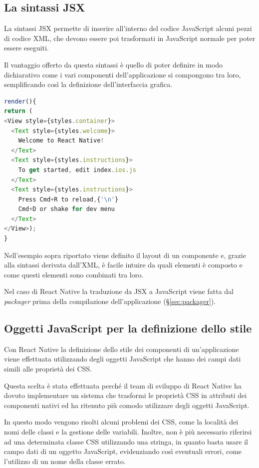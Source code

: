 \subsection{La sintassi JSX}

La sintassi JSX permette di inserire all'interno del codice JavaScript alcuni pezzi di codice XML, che devono essere poi trasformati in JavaScript normale per poter essere eseguiti.

Il vantaggio offerto da questa sintassi è quello di poter definire in modo dichiarativo come i vari componenti dell'applicazione si compongono tra loro, semplificando così la definizione dell'interfaccia grafica.

\begin{lstlisting}[language=JavaScript, caption=Esempio della sintassi JSX di React Native]
render(){
return (
<View style={styles.container}>
  <Text style={styles.welcome}>
    Welcome to React Native!
  </Text>
  <Text style={styles.instructions}>
    To get started, edit index.ios.js
  </Text>
  <Text style={styles.instructions}>
    Press Cmd+R to reload,{'\n'}
    Cmd+D or shake for dev menu
  </Text>
</View>);
}
\end{lstlisting}

Nell'esempio sopra riportato viene definito il layout di un componente e, grazie alla sintassi derivata dall'XML, è facile intuire da quali elementi è composto e come questi elementi sono combinati tra loro.     

Nel caso di React Native la traduzione da JSX a JavaScript viene fatta dal \textit{packager} prima della compilazione dell'applicazione (§\ref{sec:packager}).

\subsection{Oggetti JavaScript per la definizione dello stile}

Con React Native la definizione dello stile dei componenti di un'applicazione viene effettuata utilizzando degli oggetti JavaScript che hanno dei campi dati simili alle proprietà dei CSS.

Questa scelta è stata effettuata perché il team di sviluppo di React Native ha dovuto implementare un sistema che trasformi le proprietà CSS in attributi dei componenti nativi ed ha ritenuto più comodo utilizzare degli oggetti JavaScript.

In questo modo vengono risolti alcuni problemi dei CSS, come la località dei nomi delle classi e la gestione delle variabili.
Inoltre, non è più necessario riferirsi ad una determinata classe CSS utilizzando una stringa, in quanto basta usare il campo dati di un oggetto JavaScript, evidenziando così eventuali errori, come l'utilizzo di un nome della classe errato.

